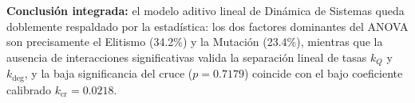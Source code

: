 \documentclass[11pt,a4paper]{article}
\begin{document}
\textbf{Conclusi\'on integrada:} el modelo aditivo lineal de Din\'amica de Sistemas queda doblemente respaldado por la estad\'istica: los dos factores dominantes del ANOVA son precisamente el Elitismo (34.2\%) y la Mutaci\'on (23.4\%), mientras que la ausencia de interacciones significativas valida la separaci\'on lineal de tasas $k_Q$ y $k_{\text{deg}}$, y la baja significancia del cruce ($p=0.7179$) coincide con el bajo coeficiente calibrado $k_{\text{cr}} = 0.0218$.
\end{document}
